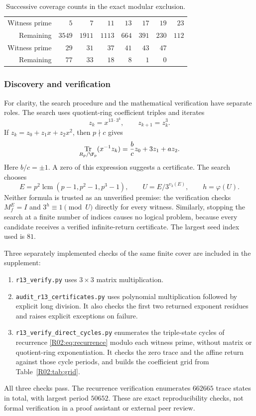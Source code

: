 \documentclass[11pt,a4paper]{article}
\theoremstyle{definition}\newtheorem{definition}[theorem]{Definition}
\theoremstyle{remark}\newtheorem{remark}[theorem]{Remark}
\DeclareMathOperator{\Tr}{Tr}\DeclareMathOperator{\tr}{tr}\DeclareMathOperator{\Nm}{N}
\DeclareMathOperator{\lcm}{lcm}\DeclareMathOperator{\disc}{disc}\DeclareMathOperator{\Res}{Res}
\begin{document}
\begin{table}[ht]
\centering
\begin{tabular}{r|rrrrrrr}
\toprule
Witness prime & $5$ & $7$ & $11$ & $13$ & $17$ & $19$ & $23$\\
Remaining & $3549$ & $1911$ & $1113$ & $664$ & $391$ & $230$ & $112$\\
\midrule
Witness prime & $29$ & $31$ & $37$ & $41$ & $43$ & $47$ & \\
Remaining & $77$ & $33$ & $18$ & $8$ & $1$ & $0$ & \\
\bottomrule
\end{tabular}
\caption{Successive coverage counts in the exact modular exclusion.}
\label{R02:tab:sieve}
\end{table}

\subsubsection{Discovery and verification}

For clarity, the search procedure and the mathematical verification
have separate roles. The search uses quotient-ring coefficient triples
and iterates
\[
 z_k=x^{13\cdot3^k},\qquad z_{k+1}=z_k^3.
\]
If $z_k=z_0+z_1x+z_2x^2$, then $p\nmid c$ gives
\[
 \Tr_{R_p/\F_p}(x^{-1}z_k)
 =\frac bc z_0+3z_1+az_2.
\]
Here $b/c=\pm1$. A zero of this expression suggests a certificate.
The search chooses
\[
 E=p^2\lcm(p-1,p^2-1,p^3-1),\qquad
 U=E/3^{v_3(E)},\qquad h=\varphi(U).
\]
Neither formula is trusted as an unverified premise: the verification
checks $M_f^E=I$ and $3^h\equiv1\pmod U$ directly for every witness.
Similarly, stopping the search at a finite number of indices causes
no logical problem, because every candidate receives a verified
infinite-return certificate. The largest seed index used is $81$.

Three separately implemented checks of the same finite cover are
included in the supplement:
\begin{enumerate}[label=\textup{(\roman*)}]
\item \texttt{r13\_verify.py} uses $3\times3$ matrix multiplication.
\item \texttt{audit\_r13\_certificates.py} uses polynomial multiplication
followed by explicit long division. It also checks the first two
returned exponent residues and raises explicit exceptions on failure.
\item \texttt{r13\_verify\_direct\_cycles.py} enumerates the triple-state
cycles of recurrence \eqref{R02:eq:recurrence} modulo each witness prime,
without matrix or quotient-ring exponentiation. It checks the zero
trace and the affine return against those cycle periods, and builds
the coefficient grid from Table~\ref{R02:tab:grid}.
\end{enumerate}
All three checks pass. The recurrence verification enumerates
$662665$ trace states in total, with largest period $50652$.
These are exact reproducibility checks, not formal verification in a
proof assistant or external peer review.
\end{document}
